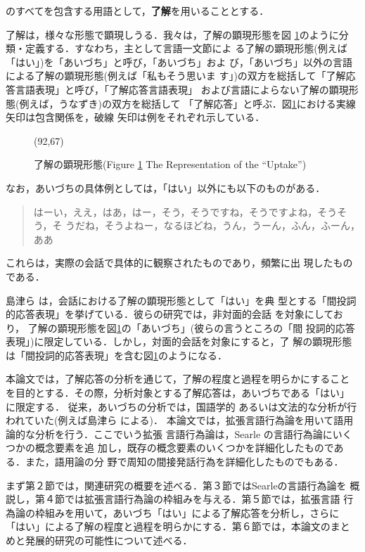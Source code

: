 \noindent のすべてを包含する用語として，{\bf 了解}を用いることとする．

了解は，様々な形態で顕現しうる．我々は，了解の顕現形態を図
\ref{response}のように分類・定義する．すなわち，主として言語一文節によ
る了解の顕現形態(例えば「はい」)を「あいづち」と呼び，「あいづち」およ
び，「あいづち」以外の言語による了解の顕現形態(例えば「私もそう思いま
す」)の双方を総括して「了解応答言語表現」と呼び，「了解応答言語表現」
および言語によらない了解の顕現形態(例えば，うなずき)の双方を総括して
「了解応答」と呼ぶ．図\ref{response}における実線矢印は包含関係を，破線
矢印は例をそれぞれ示している．

\begin{figure}[htbp]
\begin{center}
\atari(92,67)
\caption{了解の顕現形態(Figure \ref{response} The Representation of the ``Uptake'')}
\label{response}
\end{center}
\end{figure}

なお，あいづちの具体例としては，「はい」以外にも以下のものがある．

\begin{quote}
はーい，ええ，はあ，はー，そう，そうですね，そうですよね，そうそう，そ
うだね，そうよねー，なるほどね，うん，うーん，ふん，ふーん，ああ
\end{quote}

\noindent これらは，実際の会話で具体的に観察されたものであり，頻繁に出
現したものである．

島津ら\cite{shimazu} は，会話における了解の顕現形態として「はい」を典
型とする「間投詞的応答表現」を挙げている．彼らの研究では，非対面的会話
を対象にしており，
了解の顕現形態を図\ref{response}の「あいづち」(彼らの言うところの「間
投詞的応答表現」)に限定している．しかし，対面的会話を対象にすると，了
解の顕現形態は「間投詞的応答表現」を含む図\ref{response}のようになる．

本論文では，了解応答の分析を通じて，了解の程度と過程を明らかにすること
を目的とする．その際，分析対象とする了解応答は，あいづちである「はい」
に限定する．
従来，あいづちの分析では，国語学的
あるいは文法的な分析が行われていた(例えば島津ら\cite{shimazu} による)．
本論文では，拡張言語行為論を用いて語用論的な分析を行う．ここでいう拡張
言語行為論は，Searle\cite{searle} の言語行為論にいくつかの概念要素を追
加し，既存の概念要素のいくつかを詳細化したものである．また，語用論の分
野で周知の間接発話行為を詳細化したものでもある．


まず第２節では，関連研究の概要を述べる．第３節ではSearleの言語行為論を
概説し，第４節では拡張言語行為論の枠組みを与える．第５節では，拡張言語
行為論の枠組みを用いて，あいづち「はい」による了解応答を分析し，さらに
「はい」による了解の程度と過程を明らかにする．第６節では，本論文のまと
めと発展的研究の可能性について述べる．

